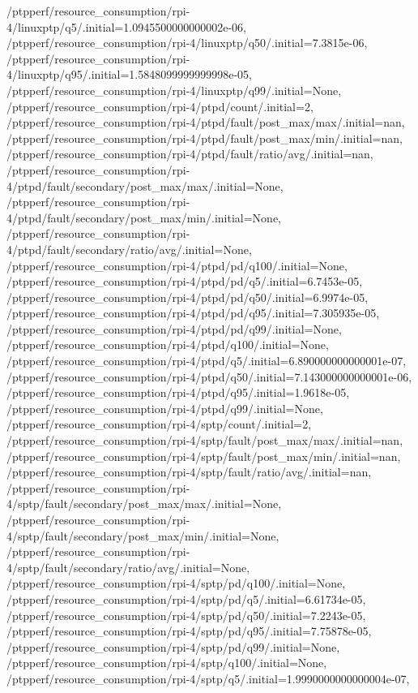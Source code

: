 {    /ptpperf/resource_consumption/rpi-4/linuxptp/q5/.initial=1.0945500000000002e-06,
    /ptpperf/resource_consumption/rpi-4/linuxptp/q50/.initial=7.3815e-06,
    /ptpperf/resource_consumption/rpi-4/linuxptp/q95/.initial=1.5848099999999998e-05,
    /ptpperf/resource_consumption/rpi-4/linuxptp/q99/.initial=None,
    /ptpperf/resource_consumption/rpi-4/ptpd/count/.initial=2,
    /ptpperf/resource_consumption/rpi-4/ptpd/fault/post_max/max/.initial=nan,
    /ptpperf/resource_consumption/rpi-4/ptpd/fault/post_max/min/.initial=nan,
    /ptpperf/resource_consumption/rpi-4/ptpd/fault/ratio/avg/.initial=nan,
    /ptpperf/resource_consumption/rpi-4/ptpd/fault/secondary/post_max/max/.initial=None,
    /ptpperf/resource_consumption/rpi-4/ptpd/fault/secondary/post_max/min/.initial=None,
    /ptpperf/resource_consumption/rpi-4/ptpd/fault/secondary/ratio/avg/.initial=None,
    /ptpperf/resource_consumption/rpi-4/ptpd/pd/q100/.initial=None,
    /ptpperf/resource_consumption/rpi-4/ptpd/pd/q5/.initial=6.7453e-05,
    /ptpperf/resource_consumption/rpi-4/ptpd/pd/q50/.initial=6.9974e-05,
    /ptpperf/resource_consumption/rpi-4/ptpd/pd/q95/.initial=7.305935e-05,
    /ptpperf/resource_consumption/rpi-4/ptpd/pd/q99/.initial=None,
    /ptpperf/resource_consumption/rpi-4/ptpd/q100/.initial=None,
    /ptpperf/resource_consumption/rpi-4/ptpd/q5/.initial=6.890000000000001e-07,
    /ptpperf/resource_consumption/rpi-4/ptpd/q50/.initial=7.143000000000001e-06,
    /ptpperf/resource_consumption/rpi-4/ptpd/q95/.initial=1.9618e-05,
    /ptpperf/resource_consumption/rpi-4/ptpd/q99/.initial=None,
    /ptpperf/resource_consumption/rpi-4/sptp/count/.initial=2,
    /ptpperf/resource_consumption/rpi-4/sptp/fault/post_max/max/.initial=nan,
    /ptpperf/resource_consumption/rpi-4/sptp/fault/post_max/min/.initial=nan,
    /ptpperf/resource_consumption/rpi-4/sptp/fault/ratio/avg/.initial=nan,
    /ptpperf/resource_consumption/rpi-4/sptp/fault/secondary/post_max/max/.initial=None,
    /ptpperf/resource_consumption/rpi-4/sptp/fault/secondary/post_max/min/.initial=None,
    /ptpperf/resource_consumption/rpi-4/sptp/fault/secondary/ratio/avg/.initial=None,
    /ptpperf/resource_consumption/rpi-4/sptp/pd/q100/.initial=None,
    /ptpperf/resource_consumption/rpi-4/sptp/pd/q5/.initial=6.61734e-05,
    /ptpperf/resource_consumption/rpi-4/sptp/pd/q50/.initial=7.2243e-05,
    /ptpperf/resource_consumption/rpi-4/sptp/pd/q95/.initial=7.75878e-05,
    /ptpperf/resource_consumption/rpi-4/sptp/pd/q99/.initial=None,
    /ptpperf/resource_consumption/rpi-4/sptp/q100/.initial=None,
    /ptpperf/resource_consumption/rpi-4/sptp/q5/.initial=1.9990000000000004e-07,
}
